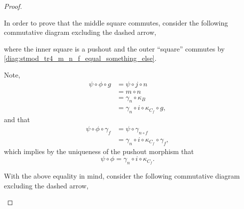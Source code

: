 \begin{proof}
\begin{enumerate}[label={(\bfseries TR\arabic*)}]
{            In order to prove that the middle square commutes, consider the following commutative diagram excluding the dashed arrow,
            \begin{center}
            \end{center}
            where the inner square is a pushout and the outer ``square'' commutes by \eqref{diag:stmod_tr4_m_n_f_equal_something_else}.

            Note,
            \begin{align*}
                \psi \circ \phi \circ g &= \psi \circ j \circ n \\
                &= m \circ n \\
                &= \gamma_n \circ \kappa_B \\
                &= \gamma_n \circ i \circ \kappa_{C_f} \circ g,
            \end{align*}
            and that
            \begin{align*}
                \psi \circ \phi \circ \gamma_f &= \psi \circ \gamma_{n \circ f} \\
                &= \gamma_n \circ i \circ \kappa_{C_f} \circ \gamma_f,
            \end{align*}
            which implies by the uniqueness of the pushout morphism that
            \[
                \psi \circ \phi = \gamma_n \circ i \circ \kappa_{C_f}.
            \]

            With the above equality in mind, consider the following commutative diagram excluding the dashed arrow,
            \begin{center}
\end{center}}
\end{enumerate}
\end{proof}
